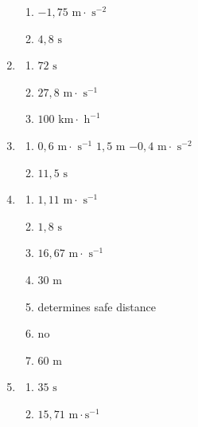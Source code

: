 \begin{multicols}{3}
\begin{enumerate}[noitemsep, label=\textbf{(\arabic*)} ]
\begin{enumerate}[noitemsep, label=\textbf{(\alph*)} ]
 \item $-1,75 \text{ m} \cdot \text{ s}^{-2}$
\item $4,8 \text{ s}$
\end{enumerate}
\item 
\begin{enumerate}[noitemsep, label=\textbf{(\alph*)} ]
 \item $72 \text{ s}$
\item $27,8 \text{ m} \cdot \text{ s}^{-1}$
\item $100 \text{ km} \cdot \text{ h}^{-1}$
\end{enumerate}
\item 
\begin{enumerate}[noitemsep, label=\textbf{(\alph*)} ]
 \item $0,6 \text{ m} \cdot \text{ s}^{-1}$ $1,5 \text{ m}$ $-0,4 \text{ m} \cdot \text{ s}^{-2}$
\item $11,5 \text{ s}$
\end{enumerate}
\item 
\begin{enumerate}[noitemsep, label=\textbf{(\alph*)} ]
 \item $1,11 \text{ m} \cdot \text{ s}^{-1}$
\item $1,8 \text{ s}$
\item $16,67 \text{ m} \cdot \text{ s}^{-1}$
\item $30 \text{ m}$
 \item determines safe distance
\item no
\item $60 \text{ m}$
\end{enumerate}
\item 
\begin{enumerate}[noitemsep, label=\textbf{(\alph*)} ]
 \item $35 \text{ s}$
\item $15,71 \text{ m}\cdot\text{s}^{-1}$
\end{enumerate}
 \end{enumerate}
\end{multicols}

